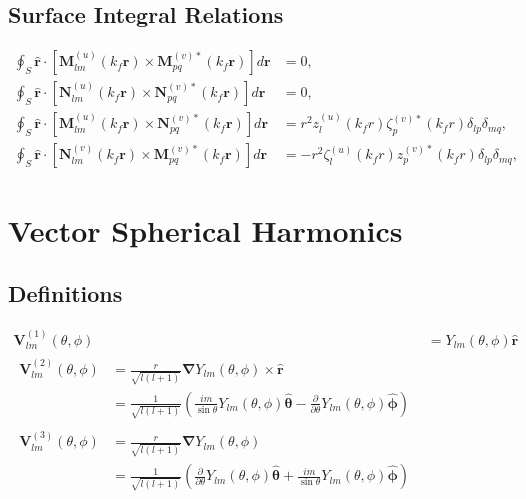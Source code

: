 \subsection{Surface Integral Relations}
%
\begin{subequations}
\begin{align}
\oint_{S} \boldsymbol{\widehat{r}} \cdot \left[ \boldsymbol{M}_{lm}^{(u)}(k_{f} \boldsymbol{r}) \times \boldsymbol{M}_{pq}^{(v)*}(k_{f} \boldsymbol{r}) \right] d\boldsymbol{r} &= 0,
\\
\oint_{S} \boldsymbol{\widehat{r}} \cdot \left[ \boldsymbol{N}_{lm}^{(u)}(k_{f} \boldsymbol{r}) \times \boldsymbol{N}_{pq}^{(v)*}(k_{f} \boldsymbol{r}) \right] d\boldsymbol{r} &= 0,
\\
\oint_{S} \boldsymbol{\widehat{r}} \cdot \left[ \boldsymbol{M}_{lm}^{(u)}(k_{f}\boldsymbol{r}) \times \boldsymbol{N}_{pq}^{(v)*}(k_{f} \boldsymbol{r}) \right] d\boldsymbol{r} &= r^2 z_{l}^{(u)}(k_{f} r) \zeta_{p}^{(v)*}(k_{f} r) \delta_{lp} \delta_{mq},
\\
\oint_{S} \boldsymbol{\widehat{r}} \cdot \left[ \boldsymbol{N}_{lm}^{(v)}(k_{f}\boldsymbol{r}) \times \boldsymbol{M}_{pq}^{(v)*}(k_{f} \boldsymbol{r}) \right] d\boldsymbol{r} &= - r^2 \zeta_{l}^{(u)}(k_{f} r) z_{p}^{(v)*}(k_{f} r) \delta_{lp} \delta_{mq},
\end{align}
\end{subequations}

\section{Vector Spherical Harmonics}

\subsection{Definitions}
%
\begin{subequations}
\begin{align}
\boldsymbol{V}_{lm}^{(1)}(\theta, \phi) &= Y_{lm}(\theta, \phi) \boldsymbol{\widehat{r}}
\\
\begin{split}
\boldsymbol{V}_{lm}^{(2)}(\theta, \phi) &= \frac{r}{\sqrt{l(l+1)}} \boldsymbol{\nabla} Y_{lm}(\theta, \phi) \times \boldsymbol{\widehat{r}}
\\
&= \frac{1}{\sqrt{l(l+1)}} \left( \frac{im}{\sin{\theta}}Y_{lm}(\theta, \phi) \boldsymbol{\widehat{\theta}} - \frac{\partial}{\partial \theta} Y_{lm}(\theta, \phi) \boldsymbol{\widehat{\phi}} \right)
\end{split}
\\
\begin{split}
\boldsymbol{V}_{lm}^{(3)}(\theta, \phi) &= \frac{r}{\sqrt{l(l+1)}} \boldsymbol{\nabla} Y_{lm}(\theta, \phi)
\\
&= \frac{1}{\sqrt{l(l+1)}} \left( \frac{\partial}{\partial \theta} Y_{lm}(\theta, \phi) \boldsymbol{\widehat{\theta}} + \frac{im}{\sin{\theta}}Y_{lm}(\theta, \phi) \boldsymbol{\widehat{\phi}} \right)
\end{split}
\end{align}
\end{subequations}

